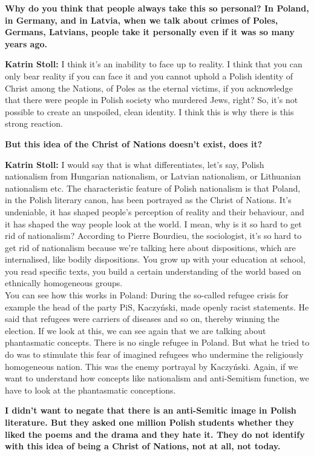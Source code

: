 \textbf{Why do you think that people always take this so personal? In Poland, in Germany, and in Latvia, when we talk about crimes of Poles, Germans, Latvians, people take it personally even if it was so many years ago.}

\textbf{Katrin Stoll:} I think it’s an inability to face up to reality. I think that you can only bear reality if you can face it and you cannot uphold a Polish identity of Christ among the Nations, of Poles as the eternal victims, if you acknowledge that there were people in Polish society who murdered Jews, right? So, it’s not possible to create an unspoiled, clean identity. I think this is why there is this strong reaction.  

\textbf{But this idea of the Christ of Nations doesn’t exist, does it?} 

\textbf{Katrin Stoll:} I would say that is what differentiates, let’s say, Polish nationalism from Hungarian nationalism, or Latvian nationalism, or Lithuanian nationalism etc. The characteristic feature of Polish nationalism is that Poland, in the Polish literary canon, has been portrayed as the Christ of Nations. It’s undeniable, it has shaped people’s perception of reality and their behaviour, and it has shaped the way people look at the world. I mean, why is it so hard to get rid of nationalism? According to Pierre Bourdieu, the sociologist, it’s so hard to get rid of nationalism because we're talking here about dispositions, which are internalised, like bodily dispositions. You grow up with your education at school, you read specific texts, you build a certain understanding of the world based on ethnically homogeneous groups.\\ 
You can see how this works in Poland: During the so-called refugee crisis for example the head of the party PiS, Kaczyński, made openly racist statements. He said that refugees were carriers of diseases and so on, thereby winning the election. If we look at this, we can see again that we are talking about phantasmatic concepts. There is no single refugee in Poland. But what he tried to do was to stimulate this fear of imagined refugees who undermine the religiously homogeneous nation. This was the enemy portrayal by Kaczyński. Again, if we want to understand how concepts like nationalism and anti-Semitism function, we have to look at the phantasmatic conceptions. 

\textbf{I didn’t want to negate that there is an anti-Semitic image in Polish literature. But they asked one million Polish students whether they liked the poems and the drama and they hate it. They do not identify with this idea of being a Christ of Nations, not at all, not today.} 

